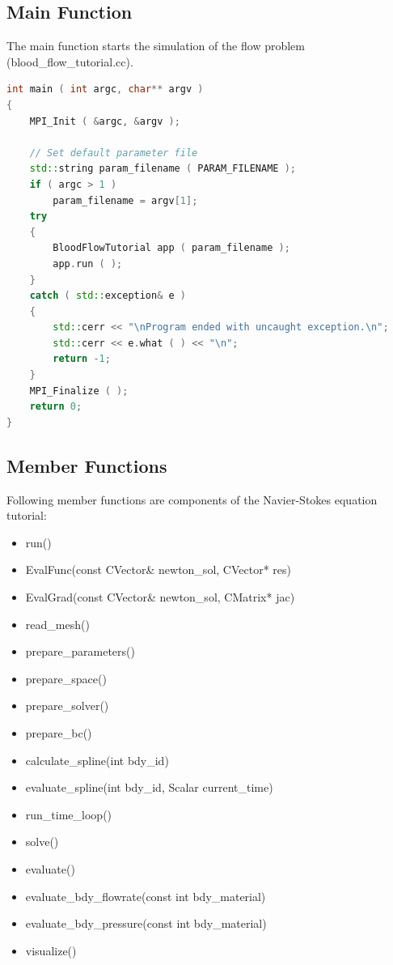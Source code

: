 \documentclass[a4paper, 11pt, twoside]{article}
\begin{document}
\subsection{Main Function}\label{main}
The main function starts the simulation of the flow problem (blood\_flow\_tutorial.cc).

\begin{lstlisting}[language=C++, basicstyle={\footnotesize, \ttfamily}, keywordstyle=\color{blue},  numbers=none, tabsize=4]
int main ( int argc, char** argv )
{
    MPI_Init ( &argc, &argv );

    // Set default parameter file
    std::string param_filename ( PARAM_FILENAME );
    if ( argc > 1 )
        param_filename = argv[1];
    try
    {
        BloodFlowTutorial app ( param_filename );
        app.run ( );
    }
    catch ( std::exception& e )
    {
        std::cerr << "\nProgram ended with uncaught exception.\n";
        std::cerr << e.what ( ) << "\n";
        return -1;
    }
    MPI_Finalize ( );
    return 0;
}
\end{lstlisting}

\subsection{Member Functions}
Following member functions are components of the Navier-Stokes equation tutorial: 
\begin{itemize}
 \item run()
 \item EvalFunc(const CVector\& newton\_sol, CVector* res)
 \item EvalGrad(const CVector\& newton\_sol, CMatrix* jac)
 \item read\_mesh()
 \item prepare\_parameters()
 \item prepare\_space()
 \item prepare\_solver()
 \item prepare\_bc()
 \item calculate\_spline(int bdy\_id)
 \item evaluate\_spline(int bdy\_id, Scalar current\_time)
 \item run\_time\_loop()
 \item solve()
 \item evaluate()
 \item evaluate\_bdy\_flowrate(const int bdy\_material)
 \item evaluate\_bdy\_pressure(const int bdy\_material)
 \item visualize()
\end{itemize}
\end{document}
